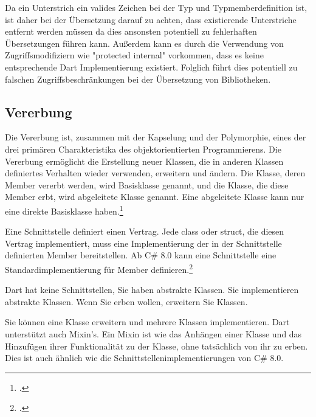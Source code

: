 \begin{minipage}{\linewidth}

\end{minipage}

Da ein Unterstrich ein valides Zeichen bei der Typ und Typmemberdefinition ist, ist daher bei der Übersetzung darauf zu achten,  dass existierende Unterstriche entfernt werden müssen da dies ansonsten potentiell zu fehlerhaften Übersetzungen führen kann.  Außerdem kann es durch die Verwendung von Zugriffsmodifiziern wie "protected internal" vorkommen, dass es keine entsprechende Dart Implementierung existiert.  Folglich führt dies potentiell zu falschen Zugriffsbeschränkungen bei der Übersetzung von Bibliotheken. 

\subsection{Vererbung}

Die Vererbung ist, zusammen mit der Kapselung und der Polymorphie, eines der drei primären Charakteristika des objektorientierten Programmierens. Die Vererbung ermöglicht die Erstellung neuer Klassen, die in anderen Klassen definiertes Verhalten wieder verwenden, erweitern und ändern. Die Klasse, deren Member vererbt werden, wird Basisklasse genannt, und die Klasse, die diese Member erbt, wird abgeleitete Klasse genannt. Eine abgeleitete Klasse kann nur eine direkte Basisklasse haben.\footcite[Vgl.  veerbung
][Abgerufen am \today]{GoogleFlutterSharedPreferences2020} 

Eine Schnittstelle definiert einen Vertrag. Jede class oder struct, die diesen Vertrag implementiert, muss eine Implementierung der in der Schnittstelle definierten Member bereitstellen. Ab C\# 8.0 kann eine Schnittstelle eine Standardimplementierung für Member definieren.\footcite[Vgl. interface (C\#-Referenz)][Abgerufen am \today]{GoogleFlutterSharedPreferences2020} 

Dart hat keine Schnittstellen, Sie haben abstrakte Klassen. Sie implementieren abstrakte Klassen. Wenn Sie erben wollen, erweitern Sie Klassen.

\begin{minipage}{\linewidth}

\end{minipage}

Sie können eine Klasse erweitern und mehrere Klassen implementieren. Dart unterstützt auch Mixin's. Ein Mixin ist wie das Anhängen einer Klasse und das Hinzufügen ihrer Funktionalität zu der Klasse, ohne tatsächlich von ihr zu erben. Dies ist auch ähnlich wie die Schnittstellenimplementierungen von C\# 8.0.

